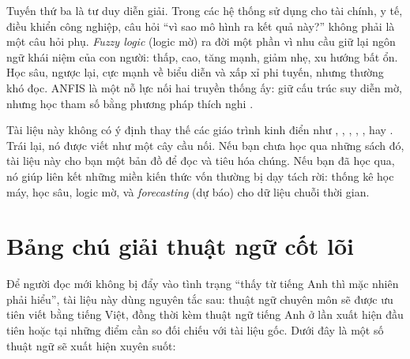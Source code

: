 Tuyến thứ ba là tư duy diễn giải. Trong các hệ thống sử dụng cho tài chính, y tế, điều khiển công nghiệp, câu hỏi ``vì sao mô hình ra kết quả này?'' không phải là một câu hỏi phụ. \emph{Fuzzy logic} (logic mờ) ra đời một phần vì nhu cầu giữ lại ngôn ngữ khái niệm của con người: thấp, cao, tăng mạnh, giảm nhẹ, xu hướng bất ổn. Học sâu, ngược lại, cực mạnh về biểu diễn và xấp xỉ phi tuyến, nhưng thường khó đọc. ANFIS là một nỗ lực nối hai truyền thống ấy: giữ cấu trúc suy diễn mờ, nhưng học tham số bằng phương pháp thích nghi \citep{zadeh1965fuzzy,ross2010fuzzy,jang1993anfis}.

Tài liệu này không có ý định thay thế các giáo trình kinh điển như \citet{bishop2006prml}, \citet{hastie2009esl}, \citet{goodfellow2016dl}, \citet{murphy2022pml}, \citet{klir1995fuzzy}, hay \citet{ross2010fuzzy}. Trái lại, nó được viết như một cây cầu nối. Nếu bạn chưa học qua những sách đó, tài liệu này cho bạn một bản đồ để đọc và tiêu hóa chúng. Nếu bạn đã học qua, nó giúp liên kết những miền kiến thức vốn thường bị dạy tách rời: thống kê học máy, học sâu, logic mờ, và \emph{forecasting} (dự báo) cho dữ liệu chuỗi thời gian.

\section*{Bảng chú giải thuật ngữ cốt lõi}

Để người đọc mới không bị đẩy vào tình trạng ``thấy từ tiếng Anh thì mặc nhiên phải hiểu'', tài liệu này dùng nguyên tắc sau: thuật ngữ chuyên môn sẽ được ưu tiên viết bằng tiếng Việt, đồng thời kèm thuật ngữ tiếng Anh ở lần xuất hiện đầu tiên hoặc tại những điểm cần so đối chiếu với tài liệu gốc. Dưới đây là một số thuật ngữ sẽ xuất hiện xuyên suốt:

